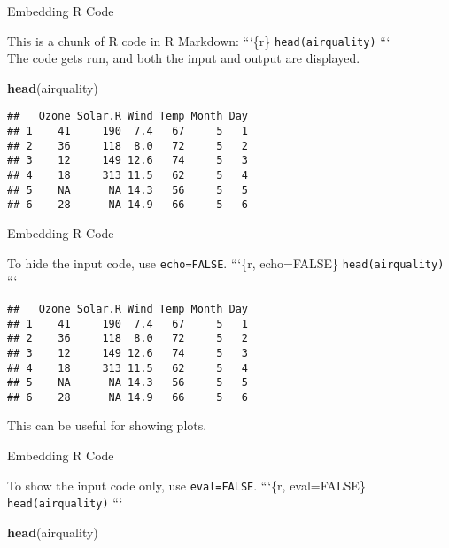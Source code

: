 \documentclass[
  ignorenonframetext,
]{beamer}
\newenvironment{Shaded}{\begin{snugshade}}{\end{snugshade}}
\newcommand{\KeywordTok}[1]{\textcolor[rgb]{0.13,0.29,0.53}{\textbf{#1}}}
\newcommand{\NormalTok}[1]{#1}
\begin{document}
\begin{frame}[fragile]{Embedding R Code}
\protect\hypertarget{embedding-r-code}{}

This is a chunk of R code in R Markdown: ```\{r\}
\texttt{head(airquality)} ```\\
The code gets run, and both the input and output are displayed.

\begin{Shaded}
\begin{Highlighting}[]
\KeywordTok{head}\NormalTok{(airquality)}
\end{Highlighting}
\end{Shaded}

\begin{verbatim}
##   Ozone Solar.R Wind Temp Month Day
## 1    41     190  7.4   67     5   1
## 2    36     118  8.0   72     5   2
## 3    12     149 12.6   74     5   3
## 4    18     313 11.5   62     5   4
## 5    NA      NA 14.3   56     5   5
## 6    28      NA 14.9   66     5   6
\end{verbatim}

\end{frame}

\begin{frame}[fragile]{Embedding R Code}
\protect\hypertarget{embedding-r-code-1}{}

To hide the input code, use \texttt{echo=FALSE}. ```\{r, echo=FALSE\}
\texttt{head(airquality)} ```

\begin{verbatim}
##   Ozone Solar.R Wind Temp Month Day
## 1    41     190  7.4   67     5   1
## 2    36     118  8.0   72     5   2
## 3    12     149 12.6   74     5   3
## 4    18     313 11.5   62     5   4
## 5    NA      NA 14.3   56     5   5
## 6    28      NA 14.9   66     5   6
\end{verbatim}

This can be useful for showing plots.

\end{frame}

\begin{frame}[fragile]{Embedding R Code}
\protect\hypertarget{embedding-r-code-2}{}

To show the input code only, use \texttt{eval=FALSE}. ```\{r,
eval=FALSE\} \texttt{head(airquality)} ```

\begin{Shaded}
\begin{Highlighting}[]
\KeywordTok{head}\NormalTok{(airquality)}
\end{Highlighting}
\end{Shaded}

\end{frame}
\end{document}
